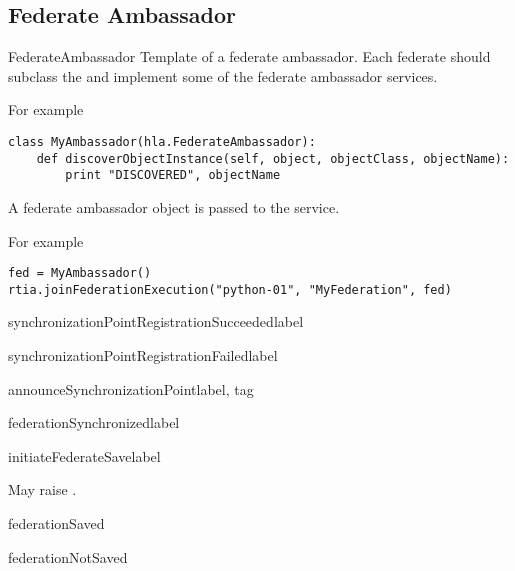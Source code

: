 \subsection{Federate Ambassador}

\begin{classdesc}{FederateAmbassador}{}
Template of a federate ambassador. Each federate should subclass the
 and implement some of the federate ambassador
services.

For example
\begin{verbatim}
class MyAmbassador(hla.FederateAmbassador):
    def discoverObjectInstance(self, object, objectClass, objectName):
        print "DISCOVERED", objectName
\end{verbatim}

A federate ambassador object is passed to the 
service.

For example
\begin{verbatim}
fed = MyAmbassador()
rtia.joinFederationExecution("python-01", "MyFederation", fed)
\end{verbatim}

\medskip
{}

\begin{methoddesc}{synchronizationPointRegistrationSucceeded}{label}
\end{methoddesc}

\begin{methoddesc}{synchronizationPointRegistrationFailed}{label}
\end{methoddesc}

\begin{methoddesc}{announceSynchronizationPoint}{label, tag}
\end{methoddesc}

\begin{methoddesc}{federationSynchronized}{label}
\end{methoddesc}

\begin{methoddesc}{initiateFederateSave}{label}

May raise
.
\end{methoddesc}

\begin{methoddesc}{federationSaved}{}
\end{methoddesc}

\begin{methoddesc}{federationNotSaved}{}
\end{methoddesc}


\end{classdesc}
